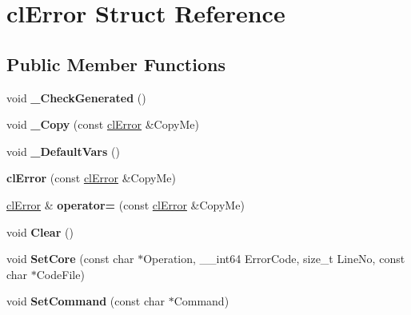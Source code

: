 \hypertarget{structcl_error}{
\section{clError Struct Reference}
\label{structcl_error}
}
\subsection*{Public Member Functions}
\begin{DoxyCompactItemize}
\item 
\hypertarget{structcl_error_a13b4a9c8985de3d496900af7067a8c54}{
void {\bfseries \_\-CheckGenerated} ()}
\label{structcl_error_a13b4a9c8985de3d496900af7067a8c54}

\item 
\hypertarget{structcl_error_ad113d68a983f33e131670edec8ae2482}{
void {\bfseries \_\-Copy} (const \hyperlink{structcl_error}{clError} \&CopyMe)}
\label{structcl_error_ad113d68a983f33e131670edec8ae2482}

\item 
\hypertarget{structcl_error_aa608c9546d5cbb210d17b4e5fbe74b02}{
void {\bfseries \_\-DefaultVars} ()}
\label{structcl_error_aa608c9546d5cbb210d17b4e5fbe74b02}

\item 
\hypertarget{structcl_error_af3b7a298fe6c7faf2c73ad936494f6a2}{
{\bfseries clError} (const \hyperlink{structcl_error}{clError} \&CopyMe)}
\label{structcl_error_af3b7a298fe6c7faf2c73ad936494f6a2}

\item 
\hypertarget{structcl_error_a4d4fb7ba3219f97a86f8e65b2b6e2661}{
\hyperlink{structcl_error}{clError} \& {\bfseries operator=} (const \hyperlink{structcl_error}{clError} \&CopyMe)}
\label{structcl_error_a4d4fb7ba3219f97a86f8e65b2b6e2661}

\item 
\hypertarget{structcl_error_a63441308cafd4c0859fc9e1d250f9217}{
void {\bfseries Clear} ()}
\label{structcl_error_a63441308cafd4c0859fc9e1d250f9217}

\item 
\hypertarget{structcl_error_a1a4824422dc4c1e643bf2df342cb3753}{
void {\bfseries SetCore} (const char $\ast$Operation, \_\-\_\-int64 ErrorCode, size\_\-t LineNo, const char $\ast$CodeFile)}
\label{structcl_error_a1a4824422dc4c1e643bf2df342cb3753}

\item 
\hypertarget{structcl_error_acb100f3ec45fe91b42a88ad1376c8ad0}{
void {\bfseries SetCommand} (const char $\ast$Command)}
\label{structcl_error_acb100f3ec45fe91b42a88ad1376c8ad0}


\end{DoxyCompactItemize}
